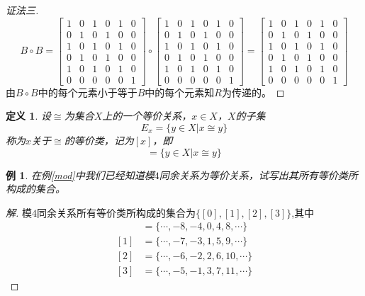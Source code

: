 \documentclass{article}
\newtheorem{Def}{定义}
\newtheorem{Example}{例}
\begin{document}
\begin{CJK*}{UTF8}{gbsn}
\begin{proof}[证法三]
      \[B\circ B=\begin{bmatrix}
          1&0&1&0&1&0\\
          0&1&0&1&0&0\\
          1&0&1&0&1&0\\
          0&1&0&1&0&0\\
          1&0&1&0&1&0\\
          0&0&0&0&0&1
        \end{bmatrix}\circ\begin{bmatrix}
          1&0&1&0&1&0\\
          0&1&0&1&0&0\\
          1&0&1&0&1&0\\
          0&1&0&1&0&0\\
          1&0&1&0&1&0\\
          0&0&0&0&0&1
        \end{bmatrix}=\begin{bmatrix}
          1&0&1&0&1&0\\
          0&1&0&1&0&0\\
          1&0&1&0&1&0\\
          0&1&0&1&0&0\\
          1&0&1&0&1&0\\
          0&0&0&0&0&1
        \end{bmatrix}
      \]
      由$B\circ B$中的每个元素小于等于$B$中的每个元素知$R$为传递的。
    \end{proof}
  \begin{Def}
    设$\cong$为集合$X$上的一个等价关系，$x\in X$，$X$的子集
    \[E_x=\{y\in X | x \cong y\}\]称为$x$关于$\cong$的等价类，记为$[x]$，即
    \begin{equation*}
      [x] = \{y \in X | x \cong y\}
    \end{equation*}
  \end{Def}
  \begin{Example}
    在例\ref{mod}中我们已经知道模$4$同余关系为等价关系，试写出其所有等价类所构成的集合。
  \end{Example}
  \begin{proof}[解]
    模$4$同余关系所有等价类所构成的集合为$\{[0],[1],[2],[3]\}$,其中
    \begin{align*}
      [0]&=\{\cdots,-8,-4,0,4,8,\cdots\}\\
      [1]&=\{\cdots,-7,-3,1,5,9,\cdots\}\\
      [2]&=\{\cdots,-6,-2,2,6,10,\cdots\}\\
      [3]&=\{\cdots,-5,-1,3,7,11,\cdots\}

\end{align*}
\end{proof}
\end{CJK*}
\end{document}
